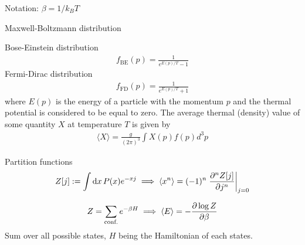 \documentclass[main]{subfiles}
\begin{document}
Notation: $\beta = 1/k_BT$

\begin{multicols}{2}

Maxwell-Boltzmann distribution

Bose-Einstein distribution
\begin{gather}
    f_\text{BE}(p) = \frac{1}{e^{E(p)/T} - 1}
\end{gather}
Fermi-Dirac distribution
\begin{gather}
    f_\text{FD}(p) = \frac{1}{e^{E(p)/T} + 1}
\end{gather}
where $E(p)$ is the energy of a particle with the momentum $p$ and the thermal potential is considered to be equal to zero. The average thermal (density) value of some quantity $X$ at temperature $T$ is given by
\begin{gather}
    \langle X\rangle = \frac{g}{(2\pi)^3} \int X(p)f(p) d^3p
\end{gather}



Partition functions
\begin{gather}
    Z[j] := \int\dd{x} P(x) e^{-xj} \implies \langle x^n \rangle = (-1)^n \eval{\pdv[n]{Z[j]}{j}}_{j=0}
\end{gather}

\begin{gather}
    Z = \sum_{\text{conf.}} e^{-\beta H} \implies \langle E \rangle = -\pdv{\log Z}{\beta}
\end{gather}
Sum over all possible states, $H$ being the Hamiltonian of each states.

\end{multicols}
\end{document}
